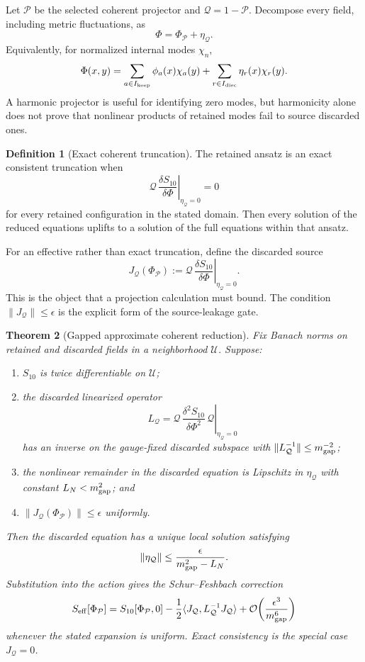\documentclass[11pt,a4paper]{article}
\newtheorem{theorem}{Theorem}[section]
\theoremstyle{definition}
\newtheorem{definition}[theorem]{Definition}
\theoremstyle{remark}
\newcommand{\cP}{\mathcal P}
\newcommand{\cQ}{\mathcal Q}
\newcommand{\cO}{\mathcal O}
\newcommand{\eff}{\mathrm{eff}}
\begin{document}
Let \(\cP\) be the selected coherent projector and
\(\cQ=1-\cP\).  Decompose every field, including metric fluctuations, as
\[
 \Phi=\Phi_{\cP}+\eta_{\cQ}.
\]
Equivalently, for normalized internal modes \(\chi_n\),
\[
 \Phi(x,y)=
 \sum_{a\in I_{\rm keep}}\phi_a(x)\chi_a(y)
 +\sum_{r\in I_{\rm disc}}\eta_r(x)\chi_r(y).
\]
A harmonic projector is useful for identifying zero modes, but harmonicity
alone does not prove that nonlinear products of retained modes fail to source
discarded ones.

\begin{definition}[Exact coherent truncation]
The retained ansatz is an exact consistent truncation when
\begin{equation}
 \left.
 \cQ\,\frac{\delta S_{10}}{\delta\Phi}
 \right|_{\eta_{\cQ}=0}=0
\label{eq:exacttrunc}
\end{equation}
for every retained configuration in the stated domain.  Then every solution
of the reduced equations uplifts to a solution of the full equations within
that ansatz.
\end{definition}

For an effective rather than exact truncation, define the discarded source
\[
 J_{\cQ}(\Phi_{\cP})
 :=
 \left.
 \cQ\,\frac{\delta S_{10}}{\delta\Phi}
 \right|_{\eta_{\cQ}=0}.
\]
This is the object that a projection calculation must bound.  The condition
\(\|J_{\cQ}\|\le\epsilon\) is the explicit form of the source-leakage gate.

\begin{theorem}[Gapped approximate coherent reduction]
\label{thm:controlled}
Fix Banach norms on retained and discarded fields in a neighborhood
\(\mathcal U\).  Suppose:
\begin{enumerate}[label=(\roman*)]
\item \(S_{10}\) is twice differentiable on \(\mathcal U\);
\item the discarded linearized operator
\[
 L_{\cQ}
 =\left.
 \cQ\,\frac{\delta^2S_{10}}{\delta\Phi^2}\,\cQ
 \right|_{\eta_{\cQ}=0}
\]
has an inverse on the gauge-fixed discarded subspace with
\(\|L_{\cQ}^{-1}\|\le m_{\rm gap}^{-2}\);
\item the nonlinear remainder in the discarded equation is Lipschitz in
\(\eta_{\cQ}\) with constant \(L_N<m_{\rm gap}^{2}\); and
\item \(\|J_{\cQ}(\Phi_{\cP})\|\le\epsilon\) uniformly.
\end{enumerate}
Then the discarded equation has a unique local solution satisfying
\begin{equation}
 \|\eta_{\cQ}\|
 \le
 \frac{\epsilon}{m_{\rm gap}^{2}-L_N}.
\label{eq:etabound}
\end{equation}
Substitution into the action gives the Schur--Feshbach correction
\begin{equation}
 S_{\eff}[\Phi_{\cP}]
 =S_{10}[\Phi_{\cP},0]
 -\frac12\langle J_{\cQ},L_{\cQ}^{-1}J_{\cQ}\rangle
 +\cO\!\left(\frac{\epsilon^3}{m_{\rm gap}^{6}}\right)
\label{eq:schur}
\end{equation}
whenever the stated expansion is uniform.  Exact consistency is the special
case \(J_{\cQ}=0\).
\end{theorem}
\end{document}
